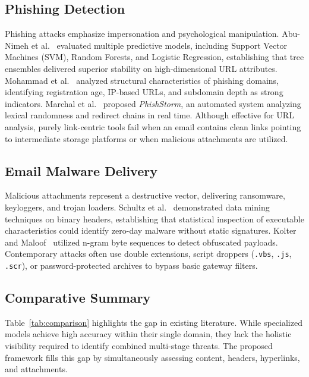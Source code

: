\documentclass[conference]{IEEEtran}
\begin{document}
\subsection{Phishing Detection}
Phishing attacks emphasize impersonation and psychological manipulation. Abu-Nimeh et al.~\cite{b4} evaluated multiple predictive models, including Support Vector Machines (SVM), Random Forests, and Logistic Regression, establishing that tree ensembles delivered superior stability on high-dimensional URL attributes. Mohammad et al.~\cite{b5} analyzed structural characteristics of phishing domains, identifying registration age, IP-based URLs, and subdomain depth as strong indicators. Marchal et al.~\cite{b6} proposed \textit{PhishStorm}, an automated system analyzing lexical randomness and redirect chains in real time. Although effective for URL analysis, purely link-centric tools fail when an email contains clean links pointing to intermediate storage platforms or when malicious attachments are utilized.

\subsection{Email Malware Delivery}
Malicious attachments represent a destructive vector, delivering ransomware, keyloggers, and trojan loaders. Schultz et al.~\cite{b7} demonstrated data mining techniques on binary headers, establishing that statistical inspection of executable characteristics could identify zero-day malware without static signatures. Kolter and Maloof~\cite{b8} utilized n-gram byte sequences to detect obfuscated payloads. Contemporary attacks often use double extensions, script droppers (\texttt{.vbs}, \texttt{.js}, \texttt{.scr}), or password-protected archives to bypass basic gateway filters.

\subsection{Comparative Summary}
Table~\ref{tab:comparison} highlights the gap in existing literature. While specialized models achieve high accuracy within their single domain, they lack the holistic visibility required to identify combined multi-stage threats. The proposed framework fills this gap by simultaneously assessing content, headers, hyperlinks, and attachments.
\end{document}
